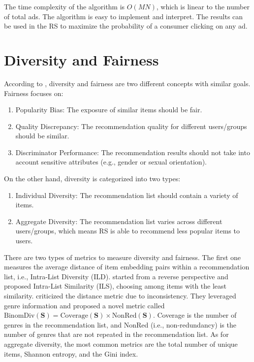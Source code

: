 \documentclass[12pt]{article}
\theoremstyle{definition}
\newcommand{\matr}[1]{\mathbf{#1}} %
\begin{document}
\begin{sloppypar}
The time complexity of the algorithm is $O(MN)$, which is linear to the number of total ads. The algorithm is easy to implement and interpret. The results can be used in the RS to maximize the probability of a consumer clicking on any ad.

\section{Diversity and Fairness}
According to \textcite{zhao2024}, diversity and fairness are two different concepts with similar goals. Fairness focuses on:
\begin{enumerate} \item Popularity Bias: The exposure of similar items should be fair. \item Quality Discrepancy: The recommendation quality for different users/groups should be similar. \item Discriminator Performance: The recommendation results should not take into account sensitive attributes (e.g., gender or sexual orientation). \end{enumerate}

On the other hand, diversity is categorized into two types: \begin{enumerate} \item Individual Diversity: The recommendation list should contain a variety of items. \item Aggregate Diversity: The recommendation list varies across different users/groups, which means RS is able to recommend less popular items to users. \end{enumerate}

There are two types of metrics to measure diversity and fairness. The first one measures the average distance of item embedding pairs within a recommendation list, i.e., Intra-List Diversity (ILD). \textcite{10.1145/1060745.1060754} started from a reverse perspective and proposed Intra-List Similarity (ILS), choosing among items with the least similarity. \textcite{10.1145/2645710.2645743} criticized the distance metric due to inconsistency. They leveraged genre information and proposed a novel metric called $\mathrm{BinomDiv(\matr{S})} = \mathrm{Coverage(\matr{S})}\times\mathrm{NonRed(\matr{S})}$. Coverage is the number of genres in the recommendation list, and NonRed (i.e., non-redundancy) is the number of genres that are not repeated in the recommendation list. As for aggregate diversity, the most common metrics are the total number of unique items, Shannon entropy, and the Gini index.


\end{sloppypar}
\end{document}
